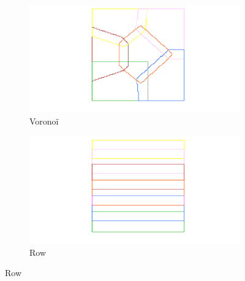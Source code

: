 \documentclass[a4paper,11pt]{article}
\begin{document}
\begin{figure}[H]\ContinuedFloat
	\begin{subfigure}[b]{0.45\textwidth}
		\hspace{-2.5cm}
		\includegraphics[width=1.5\textwidth]{voronoi_6.png}
		\caption{Voronoï}
	\end{subfigure}
	\hfill
	\begin{subfigure}[b]{0.45\textwidth}
		\hspace{-2.5cm}
		\includegraphics[width=1.5\textwidth]{row_6.png}
		\caption{Row}
	\end{subfigure}
\end{figure}
\end{document}
